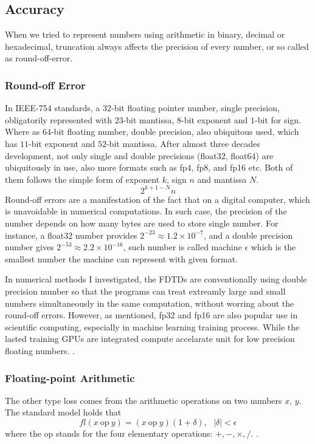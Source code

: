   


\subsection{Accuracy}
When we tried to represent numbers using arithmetic in binary, decimal or hexadecimal, truncation always affects the precision of every number, 
or so called as 
round-off-error.

\subsubsection{Round-off Error}
In IEEE-754 \cite{IEEE_754} standards, a $32$-bit floating pointer number, single precision, obligatorily represented with $23$-bit mantissa, 
$8$-bit exponent and $1$-bit for sign. 
Where as $64$-bit floating number, double precision, also ubiquitous used, which has $11$-bit exponent and $52$-bit mantissa.
After almost three decades development, not only single and double precisions (float32, float64) are ubiquitously in use, 
also more formats such as fp4, fp8, and fp16 etc. Both of them follows the simple form of exponent $k$, sign $n$ and mantissa $N$. 
\cite{IEEE_754_p2_eq1}
\begin{equation*}
  2^{k+1-N}n
\end{equation*}
Round-off errors are a manifestation of the fact that on a digital computer, which is unavoidable in numerical computations.
In such case, the precision of the number depends on how many bytes are used to store single number. 
For instance, a float32 number provides $2^{-23} \approx 1.2\times10^{-7}$, and a double precision number gives $2^{-53} \approx 2.2\times10^{-16}$, 
such number is called machine $\epsilon$ which is the smallest number the machine can represent with given format.

In numerical methods I investigated, the FDTDs are conventionally using double precision number so that the programs can treat extreamly large and small 
numbers simultaneously in the same computation, without worring about the round-off errors.
However, as mentioned, fp32 and fp16 are also popular use in scientific computing, especially in machine learning training process. 
While the lasted training GPUs are integrated compute accelarate unit for low precision floating numbers. \cite{NVIDIA_HB200_PAPER}.

\subsubsection{Floating-point Arithmetic}
The other type loss comes from the arithmetic operations on two numbers $x$, $y$. 
The standard model holds that 
\begin{equation}
  fl(x \:\text{op}\: y) = (x \: \text{op} \: y) (1+\delta), \:\:\: \left|\delta\right| < \epsilon
\end{equation}
where the op stands for the four elementary operations: $+, -, \times, /$. \cite{Germund,NMSC,V1,P112}.


